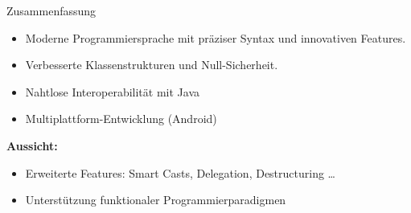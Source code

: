 \documentclass{beamer}
\begin{document}
\begin{frame}{Zusammenfassung} %
  \begin{itemize}
    \item Moderne Programmiersprache mit präziser Syntax und innovativen Features.
    \item Verbesserte Klassenstrukturen und Null-Sicherheit.
    \item Nahtlose Interoperabilität mit Java
    \item Multiplattform-Entwicklung (Android)
  \end{itemize}
  \vspace{1cm}
  \pause\textbf{Aussicht:}
  \begin{itemize}
    \item Erweiterte Features: Smart Casts, Delegation, Destructuring \ldots
    \item Unterstützung funktionaler Programmierparadigmen
  \end{itemize}
\end{frame}
  
\end{document}
